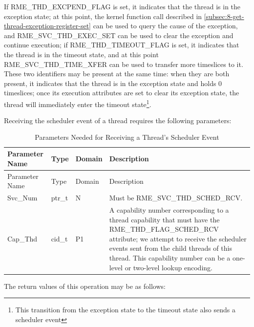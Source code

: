 If RME\_THD\_EXCPEND\_FLAG is set, it indicates that the thread is in the exception state; at this point, the kernel function call described in \ref{subsec:8-get-thread-exception-register-set}
can be used to query the cause of the exception, and RME\_SVC\_THD\_EXEC\_SET can be used to clear the exception and continue execution; if RME\_THD\_TIMEOUT\_FLAG is set, it indicates that the thread is in the timeout state, and at this point RME\_SVC\_THD\_TIME\_XFER can be used to transfer more timeslices to it. These two identifiers may be present at the same time: when they are both present, it indicates that the thread is in the exception state and holds 0 timeslices; once its execution attributes are set to clear its exception state, the thread will immediately enter the timeout state\footnote{This transition from the exception state to the timeout state also sends a scheduler event}.

Receiving the scheduler event of a thread requires the following parameters:

\begin{xltabular}{\textwidth}{@{}>{\hsize\raggedright\arraybackslash}X>{\hsize\raggedright\arraybackslash}X>{\hsize\raggedright\arraybackslash}X>{\hsize\raggedright\arraybackslash}X@{}}
\caption{Parameters Needed for Receiving a Thread's Scheduler Event}\label{tab:4-32-receive-thread-scheduler-event-parameters}\\
\toprule
Parameter Name & Type & Domain & Description\tabularnewline
\endfirsthead
\toprule
Parameter Name & Type & Domain & Description\tabularnewline
\midrule
\endhead
\bottomrule
\endlastfoot
Svc\_Num & ptr\_t & N & Must be RME\_SVC\_THD\_SCHED\_RCV.\tabularnewline
Cap\_Thd & cid\_t & P1 &
A capability number corresponding to a thread capability that must have the RME\_THD\_FLAG\_SCHED\_RCV attribute; we attempt to receive the scheduler events sent from the child threads of this thread. This capability number can be a one-level or two-level lookup encoding.\tabularnewline
\end{xltabular}
\nopagebreak[4]

The return values of this operation may be as follows:

